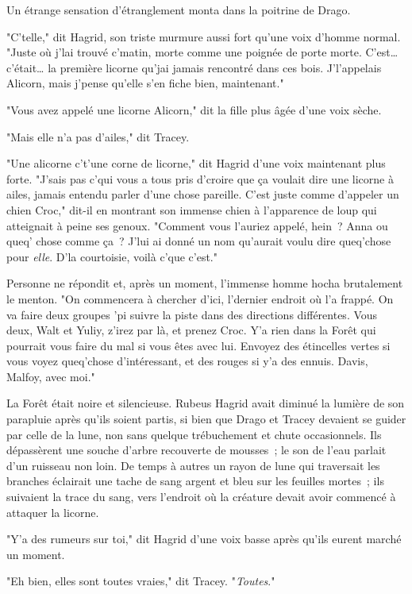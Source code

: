 Un étrange sensation d'étranglement monta dans la poitrine de Drago.

"C'telle," dit Hagrid, son triste murmure aussi fort qu'une voix d'homme normal. "Juste où j'lai trouvé c'matin, morte comme une poignée de porte morte. C'est… c'était… la première licorne qu'jai jamais rencontré dans ces bois. J'l'appelais Alicorn, mais j'pense qu'elle s'en fiche bien, maintenant."

"Vous avez appelé une licorne Alicorn," dit la fille plus âgée d'une voix sèche.

"Mais elle n'a pas d'ailes," dit Tracey.

"Une alicorne c't'une corne de licorne," dit Hagrid d'une voix maintenant plus forte. "J'sais pas c'qui vous a tous pris d'croire que ça voulait dire une licorne à ailes, jamais entendu parler d'une chose pareille. C'est juste comme d'appeler un chien Croc," dit-il en montrant son immense chien à l'apparence de loup qui atteignait à peine ses genoux. "Comment vous l'auriez appelé, hein~? Anna ou queq' chose comme ça~? J'lui ai donné un nom qu'aurait voulu dire queq'chose pour \emph{elle}. D'la courtoisie, voilà c'que c'est."

Personne ne répondit et, après un moment, l'immense homme hocha brutalement le menton. "On commencera à chercher d'ici, l'dernier endroit où l'a frappé. On va faire deux groupes 'pi suivre la piste dans des directions différentes. Vous deux, Walt et Yuliy, z'irez par là, et prenez Croc. Y'a rien dans la Forêt qui pourrait vous faire du mal si vous êtes avec lui. Envoyez des étincelles vertes si vous voyez queq'chose d'intéressant, et des rouges si y'a des ennuis. Davis, Malfoy, avec moi."

La Forêt était noire et silencieuse. Rubeus Hagrid avait diminué la lumière de son parapluie après qu'ils soient partis, si bien que Drago et Tracey devaient se guider par celle de la lune, non sans quelque trébuchement et chute occasionnels. Ils dépassèrent une souche d'arbre recouverte de mousses~; le son de l'eau parlait d'un ruisseau non loin. De temps à autres un rayon de lune qui traversait les branches éclairait une tache de sang argent et bleu sur les feuilles mortes~; ils suivaient la trace du sang, vers l'endroit où la créature devait avoir commencé à attaquer la licorne.

"Y'a des rumeurs sur toi," dit Hagrid d'une voix basse après qu'ils eurent marché un moment.

"Eh bien, elles sont toutes vraies," dit Tracey. "\emph{Toutes}."

